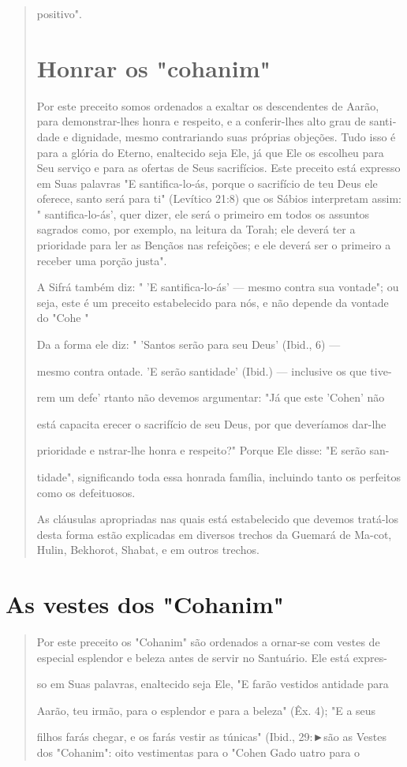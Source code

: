 \begin{quote}
positivo".

\section{Honrar os "cohanim"}

Por este preceito somos ordenados a exaltar os descendentes de Aa­rão,
para demonstrar-lhes honra e respeito, e a conferir-lhes alto grau de
santi­dade e dignidade, mesmo contrariando suas próprias objeções. Tudo
isso é pa­ra a glória do Eterno, enaltecido seja Ele, já que Ele os
escolheu para Seu servi­ço e para as ofertas de Seus sacrifícios. Este
preceito está expresso em Suas pa­lavras "E santifica-lo-ás, porque o
sacrifício de teu Deus ele oferece, santo será para ti" (Levítico 21:8)
que os Sábios interpretam assim: " santifica-lo-ás', quer dizer, ele
será o primeiro em todos os assuntos sagrados como, por exemplo, na
leitura da Torah; ele deverá ter a prioridade para ler as Bençãos nas
refei­ções; e ele deverá ser o primeiro a receber uma porção justa".

A Sifrá também diz: " 'E santifica-lo-ás' --- mesmo contra sua
vonta­de"; ou seja, este é um preceito estabelecido para nós, e não
depende da von­tade do "Cohe "

Da a forma ele diz: " 'Santos serão para seu Deus' (Ibid., 6) ---

mesmo contra ontade. 'E serão santidade' (Ibid.) --- inclusive os que
tive-

rem um defe' rtanto não devemos argumentar: "Já que este 'Cohen' não

está capacita erecer o sacrifício de seu Deus, por que deveríamos
dar-lhe

prioridade e nstrar-lhe honra e respeito?" Porque Ele disse: "E serão
san-

tidade", significando toda essa honrada família, incluindo tanto os
perfeitos co­mo os defeituosos.

As cláusulas apropriadas nas quais está estabelecido que devemos
tratá-los desta forma estão explicadas em diversos trechos da Guemará de
Ma-cot, Hulin, Bekhorot, Shabat, e em outros trechos.
\end{quote}

\section{As vestes dos "Cohanim"}

\begin{quote}
Por este preceito os "Cohanim" são ordenados a ornar-se com ves­tes de
especial esplendor e beleza antes de servir no Santuário. Ele está
expres-

so em Suas palavras, enaltecido seja Ele, "E farão vestidos antidade
para

Aarão, teu irmão, para o esplendor e para a beleza" (Êx. 4); "E a seus

filhos farás chegar, e os farás vestir as túnicas" (Ibid., 29:►são as
Vestes\\
dos "Cohanim": oito vestimentas para o "Cohen Gado uatro para o
\end{quote}

